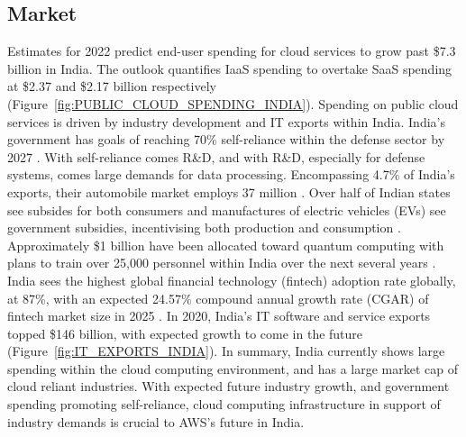 \documentclass[a4paper, 12pt]{article}
\begin{document}
\subsection{Market}
Estimates for 2022 predict end-user spending for cloud services to grow past \$7.3 billion in India. 
The outlook quantifies IaaS spending to overtake SaaS spending at \$2.37 and \$2.17 billion respectively (Figure~\ref{fig:PUBLIC_CLOUD_SPENDING_INDIA}). 
Spending on public cloud services is driven by industry development and IT exports within India. 
India's government has goals of reaching 70\% self-reliance within the defense sector by 2027 \cite[p.~10]{INDIA_DEFENSE_CORRIDOR}. 
With self-reliance comes R\&D, and with R\&D, especially for defense systems, comes large demands for data processing. 
Encompassing 4.7\% of India's exports, their automobile market employs 37 million \cite{INDIA_INVEST_SECTORS}.
Over half of Indian states see subsides for both consumers and manufactures of electric vehicles (EVs) see government subsidies, incentivising both production and consumption \cite[p.~5-28]{INDIA_EV_POLICIES}. 
Approximately \$1 billion have been allocated toward quantum computing with plans to train over 25,000 personnel within India over the next several years \cite[p~.16,20]{INDIA_EMERGING_FINANCIALS}. 
India sees the highest global financial technology (fintech) adoption rate globally, at 87\%, with an expected 24.57\% compound annual growth rate (CGAR) of fintech market size in 2025 \cite{INDIA_INVEST_SECTORS}. 
In 2020, India's IT software and service exports topped \$146 billion, with expected growth to come in the future (Figure~\ref{fig:IT_EXPORTS_INDIA}). 
In summary, India currently shows large spending within the cloud computing environment, and has a large market cap of cloud reliant industries. 
With expected future industry growth, and government spending promoting self-reliance, cloud computing infrastructure in support of industry demands is crucial to AWS's future in India. 

\end{document}
